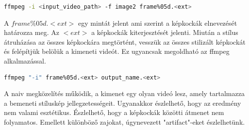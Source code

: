 \documentclass[12pt, a4paper, oneside]{book}
\theoremstyle{tetel}
\begin{document}
\begin{lstlisting}[language=bash]
ffmpeg -i <input_video_path> -f image2 frame%05d.<ext>
\end{lstlisting}

A \(frame\%05d.<ext>\) egy mintát jelent ami szerint a képkockák elnevezését határozza meg. Az \(<ext>\) a képkockák kiterjesztését jelenti.
\newline
\indent
Miután a stílus átruházása az összes képkockára megtörtént, vesszük az összes stilizált képkockát és felépítjük belölük a kimeneti videót. Ez ugyancsak megoldható az ffmpeg alkalmazással.

\begin{lstlisting}[language=bash]
ffmpeg "-i" frame%05d.<ext> output_name.<ext>
\end{lstlisting}

A naiv megközelítés működik, a kimenet egy olyan videó lesz, amely tartalmazza a bemeneti stíluskép jellegzetességeit. Ugyanakkor észlelhető, hogy az eredmény nem valami esztétikus. Észlelhető, hogy a képkockák közötti átmenet nem folyamatos. Emellett különböző zajokat, úgynevezett "artifact"-eket észlelhetünk. 
\end{document}

